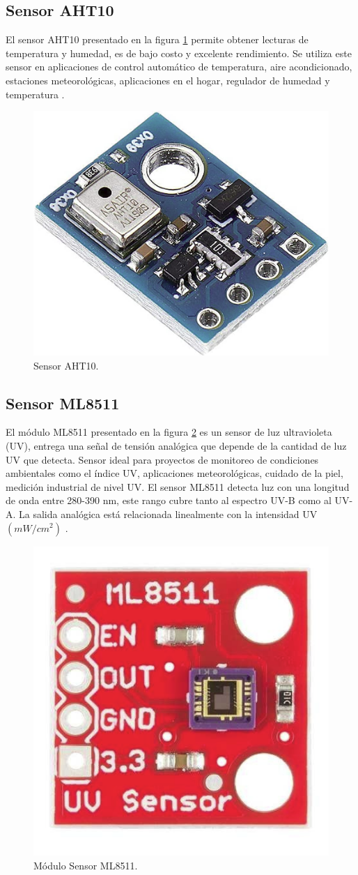 \subsection{Sensor AHT10}
El sensor AHT10 presentado en la figura \ref{fig:SensorAHT10} permite obtener lecturas de temperatura y humedad, es de bajo costo y excelente rendimiento. Se utiliza este sensor en aplicaciones de control automático de temperatura, aire acondicionado, estaciones meteorológicas, aplicaciones en el hogar, regulador de humedad y temperatura \citep{ModuloAHT10}.
\begin{figure}[htbp]
	\centering
	\includegraphics[width=.3\textwidth]{./Figures/aht10.png}
	\caption{Sensor AHT10\protect\footnotemark.}
	\label{fig:SensorAHT10}
\end{figure}
\subsection{Sensor ML8511}
El módulo ML8511 presentado en la figura \ref{fig:SensorML8511} es un sensor de luz ultravioleta (UV), entrega una señal de tensión analógica que depende de la cantidad de luz UV que detecta. Sensor ideal para proyectos de monitoreo de condiciones ambientales como el índice UV, aplicaciones meteorológicas, cuidado de la piel, medición industrial de nivel UV.
El sensor ML8511 detecta luz con una longitud de onda entre 280-390 nm, este rango cubre tanto al espectro UV-B como al UV-A. La salida analógica está relacionada linealmente con la intensidad UV $(mW/cm^2)$ \citep{ModuloML8511}.
\begin{figure}[htbp]
	\centering
	\includegraphics[width=.3\textwidth]{./Figures/ml8511.png}
	\caption[Módulo Sensor ML8511]{Módulo Sensor ML8511. \footnotemark }
	\label{fig:SensorML8511}
\end{figure}


